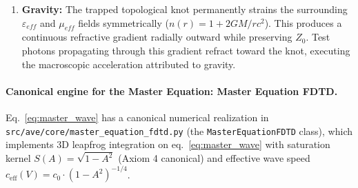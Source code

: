 \begin{enumerate}
\begin{itemize}
        \emph{Sector disambiguation (A1 $\perp$ T2, per PR\#260 / \texttt{master-equation.md}:95).} The magnetic-branch $\Gamma \to -1$\gammaundeclared{} named above is the chirality/spin \textbf{sign-selector} ($\mu$-first $\Rightarrow \Gamma=-1$\gammaundeclared{} vs $\varepsilon$-first $\Rightarrow \Gamma=+1$\gammaundeclared{} are the spin-conjugate signs); it is mute on the mass sector. The invariant rest mass is the \textbf{$A_1$ longitudinal-dilatation} confinement ($Z_{bulk} \to 0 \Rightarrow \Gamma_{bulk} = -1$ at the bulk cage), a separate grade from the $T_2$ charge-winding. The ``two 3s'' are orthogonal --- \emph{mass} $= A_1$ dilatation; \emph{charge} $= T_2$ Cosserat winding --- so ``rest mass'' here is not generated by the magnetic/charge sector; reading confinement as proceeding \emph{via} the charge sector would wire the mass-cage into the $T_2$ winding and break the $A_1 \perp T_2$ orthogonality. The magnetic-vs-electric fork is degenerate on the equilibrium observables ($Z = Z_0\sqrt{S}$, $|\Gamma|=1$\gammaundeclared{} both ways); the asymmetry is chirality-set, not substrate-forced. \textbf{[DEMOTED 2026-08-11 --- R40-B2a: NEEDS RE-DERIVATION, not dead; dated note at the end of this file]}
    \end{itemize}
    Both branches are governed by the same kernel $S(A) = \sqrt{1-(A/A_{yield})^2}$; they differ in which constitutive parameter saturates first. See the Axiom~4 derived-consequences tables (Backmatter Ch~\ref{app:universal_saturation_kernel}) for the symmetric vs asymmetric branches.
    \item \textbf{Gravity:} The trapped topological knot permanently strains the surrounding $\varepsilon_{eff}$ and $\mu_{eff}$ fields symmetrically ($n(r) = 1 + 2GM/rc^2$). This produces a continuous refractive gradient radially outward while preserving $Z_0$. Test photons propagating through this gradient refract toward the knot, executing the macroscopic acceleration attributed to gravity.
\end{enumerate}

\paragraph{Canonical engine for the Master Equation: Master Equation FDTD.}
Eq.~\ref{eq:master_wave} has a canonical numerical realization in
\texttt{src/ave/core/master\_equation\_fdtd.py} (the \texttt{MasterEquationFDTD}
class), which implements 3D leapfrog
integration on eq.~\ref{eq:master_wave} with saturation kernel
$S(A) = \sqrt{1-A^2}$ (Axiom 4 canonical) and effective wave speed
$c_{\text{eff}}(V) = c_0 \cdot (1-A^2)^{-1/4}$.

